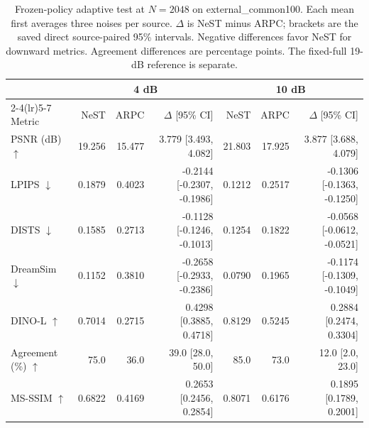 \begin{table}[t]
\centering
\caption{Frozen-policy adaptive test at $N=2048$ on external\_common100. Each mean first averages three noises per source. $\Delta$ is NeST minus ARPC; brackets are the saved direct source-paired 95\% intervals. Negative differences favor NeST for downward metrics. Agreement differences are percentage points. The fixed-full 19-dB reference is separate.}
\label{tab:adaptive2048}
\footnotesize\setlength{\tabcolsep}{3pt}
\begin{tabular}{lrrrrrr}
\toprule
 & \multicolumn{3}{c}{4 dB} & \multicolumn{3}{c}{10 dB} \\
\cmidrule(lr){2-4}\cmidrule(lr){5-7}
Metric & NeST & ARPC & $\Delta$ [95\% CI] & NeST & ARPC & $\Delta$ [95\% CI] \\
\midrule
PSNR (dB) $\uparrow$ & 19.256 & 15.477 & 3.779 [3.493, 4.082] & 21.803 & 17.925 & 3.877 [3.688, 4.079] \\
LPIPS $\downarrow$ & 0.1879 & 0.4023 & -0.2144 [-0.2307, -0.1986] & 0.1212 & 0.2517 & -0.1306 [-0.1363, -0.1250] \\
DISTS $\downarrow$ & 0.1585 & 0.2713 & -0.1128 [-0.1246, -0.1013] & 0.1254 & 0.1822 & -0.0568 [-0.0612, -0.0521] \\
DreamSim $\downarrow$ & 0.1152 & 0.3810 & -0.2658 [-0.2933, -0.2386] & 0.0790 & 0.1965 & -0.1174 [-0.1309, -0.1049] \\
DINO-L $\uparrow$ & 0.7014 & 0.2715 & 0.4298 [0.3885, 0.4718] & 0.8129 & 0.5245 & 0.2884 [0.2474, 0.3304] \\
Agreement (\%) $\uparrow$ & 75.0 & 36.0 & 39.0 [28.0, 50.0] & 85.0 & 73.0 & 12.0 [2.0, 23.0] \\
MS-SSIM $\uparrow$ & 0.6822 & 0.4169 & 0.2653 [0.2456, 0.2854] & 0.8071 & 0.6176 & 0.1895 [0.1789, 0.2001] \\
\bottomrule
\end{tabular}
\end{table}
